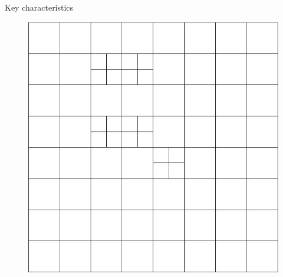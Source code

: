 \documentclass{beamer}
\begin{document}
\begin{frame}
\begin{minipage}[t][1\textheight]{1\textwidth}
\begin{exampleblock}{Key characteristics}
\begin{figure}
{\includegraphics[width=0.339\textheight, trim=0cm 0cm 0 0cm,clip=true]{./figs/cell-based-refine.jpg}}

\end{figure}
\end{exampleblock}
\end{minipage}
\end{frame}
\end{document}
